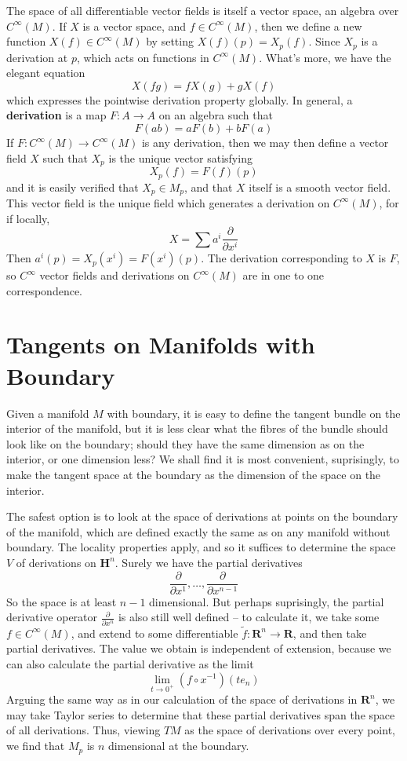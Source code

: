 The space of all differentiable vector fields is itself a vector space, an algebra over $C^\infty(M)$. If $X$ is a vector space, and $f \in C^\infty(M)$, then we define a new function $X(f) \in C^\infty(M)$ by setting $X(f)(p) = X_p(f)$. Since $X_p$ is a derivation at $p$, which acts on functions in $C^\infty(M)$. What's more, we have the elegant equation
%
\[ X(fg) = f X(g) + g X(f) \]
%
which expresses the pointwise derivation property globally. In general, a {\bf derivation} is a map $F: A \to A$ on an algebra such that
%
\[ F(ab) = a F(b) + b F(a) \]
%
If $F: C^\infty(M) \to C^\infty(M)$ is any derivation, then we may then define a vector field $X$ such that $X_p$ is the unique vector satisfying
%
\[ X_p(f) = F(f)(p) \]
%
and it is easily verified that $X_p \in M_p$, and that $X$ itself is a smooth vector field. This vector field is the unique field which generates a derivation on $C^\infty(M)$, for if locally,
%
\[ X = \sum a^i \frac{\partial}{\partial x^i} \]
%
Then $a^i(p) = X_p(x^i) = F(x^i)(p)$. The derivation corresponding to $X$ is $F$, so $C^\infty$ vector fields and derivations on $C^\infty(M)$ are in one to one correspondence.

\section{Tangents on Manifolds with Boundary}

Given a manifold $M$ with boundary, it is easy to define the tangent bundle on the interior of the manifold, but it is less clear what the fibres of the bundle should look like on the boundary; should they have the same dimension as on the interior, or one dimension less? We shall find it is most convenient, suprisingly, to make the tangent space at the boundary as the dimension of the space on the interior.

The safest option is to look at the space of derivations at points on the boundary of the manifold, which are defined exactly the same as on any manifold without boundary. The locality properties apply, and so it suffices to determine the space $V$ of derivations on $\mathbf{H}^n$. Surely we have the partial derivatives
%
\[ \frac{\partial}{\partial x^1}, \dots, \frac{\partial}{\partial x^{n-1}} \]
%
So the space is at least $n-1$ dimensional. But perhaps suprisingly, the partial derivative operator $\frac{\partial}{\partial x^n}$ is also still well defined -- to calculate it, we take some $f \in C^\infty(M)$, and extend to some differentiable $\tilde{f}: \mathbf{R}^n \to \mathbf{R}$, and then take partial derivatives. The value we obtain is independent of extension, because we can also calculate the partial derivative as the limit
%
\[ \lim_{t \to 0^+} (f \circ x^{-1})(te_n) \]
%
Arguing the same way as in our calculation of the space of derivations in $\mathbf{R}^n$, we may take Taylor series to determine that these partial derivatives span the space of all derivations. Thus, viewing $TM$ as the space of derivations over every point, we find that $M_p$ is $n$ dimensional at the boundary.

